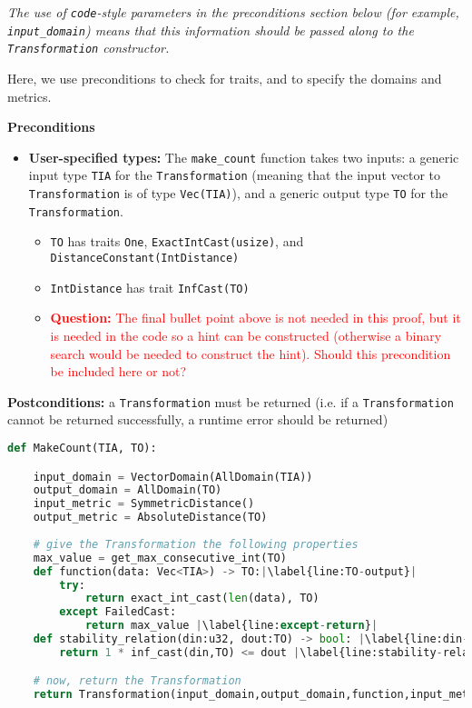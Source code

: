 \documentclass[12pt,letterpaper]{article}
\newcommand{\question}[1]{\textcolor{red}{\textbf{Question:} #1}}
\theoremstyle{definition}
\begin{document}
\emph{The use of \texttt{code}-style parameters in the preconditions section below (for example, \texttt{input\_domain}) means that this information should be passed along to the \texttt{Transformation} constructor.}

Here, we use preconditions to check for traits, and to specify the domains and metrics.

\textbf{Preconditions}
\begin{itemize}
    \item \textbf{User-specified types:} The \texttt{make\_count} function takes two inputs: a generic input type \texttt{TIA} for the \texttt{Transformation} (meaning that the input vector to \texttt{Transformation} is of type \texttt{Vec(TIA)}), and a generic output type \texttt{TO} for the \texttt{Transformation}.
    
    \begin{itemize}
        \item \texttt{TO} has traits \texttt{One}, \texttt{ExactIntCast(usize)}, and \texttt{DistanceConstant(IntDistance)}
        
        \item \texttt{IntDistance} has trait \texttt{InfCast(TO)}
        
        \item \question{The final bullet point above is not needed in this proof, but it is needed in the code so a hint can be constructed (otherwise a binary search would be needed to construct the hint). Should this precondition be included here or not?}
        
    \end{itemize}
\end{itemize}

\textbf{Postconditions:} a \texttt{Transformation} must be returned (i.e. if a \texttt{Transformation} cannot be returned successfully, a runtime error should be returned)

\begin{lstlisting}[language = Python, escapechar=|]
def MakeCount(TIA, TO):

    input_domain = VectorDomain(AllDomain(TIA))
    output_domain = AllDomain(TO)
    input_metric = SymmetricDistance()
    output_metric = AbsoluteDistance(TO)
    
    # give the Transformation the following properties
    max_value = get_max_consecutive_int(TO) 
    def function(data: Vec<TIA>) -> TO:|\label{line:TO-output}|
        try:
            return exact_int_cast(len(data), TO)
        except FailedCast:
            return max_value |\label{line:except-return}|
    def stability_relation(din:u32, dout:TO) -> bool: |\label{line:din-dout-type}|
        return 1 * inf_cast(din,TO) <= dout |\label{line:stability-relation}|

    # now, return the Transformation
    return Transformation(input_domain,output_domain,function,input_metric,output_metric,stability_relation)

\end{lstlisting}
\end{document}
